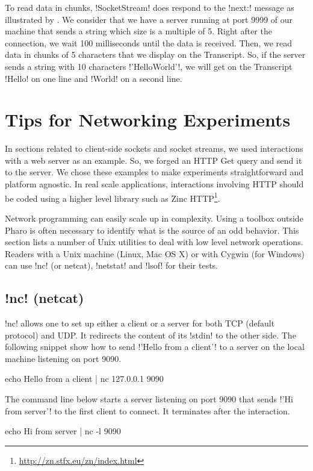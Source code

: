 \documentclass[a4paper,10pt,twoside]{book}
\begin{document}
To read data in chunks, \ct!SocketStream! does respond to the \ct!next:! message as illustrated by .
We consider that we have a server running at port 9999 of our machine that sends a string which size is a multiple of 5.
Right after the connection, we wait 100 milliseconds until the data is received.
Then, we read data in chunks of 5 characters that we display on the Transcript.
So, if the server sends a string with 10 characters \ct!'HelloWorld'!, we will get on the Transcript \ct!Hello! on one line and \ct!World! on a second line.

\section{Tips for Networking Experiments}
In sections related to client-side sockets and socket streams, we used interactions with a web server as an example. So, we forged an HTTP Get query and send it to the server.
We chose these examples to make experiments straightforward and platform agnostic.
In real scale applications, interactions involving HTTP should be coded using a higher level library such as Zinc HTTP\footnote{\url{http://zn.stfx.eu/zn/index.html}}.

Network programming can easily scale up in complexity. Using a toolbox outside Pharo is often necessary to identify what is the source of an odd behavior. This section lists a number of Unix utilities to deal with low level network operations.
Readers with a Unix machine (Linux, Mac OS X) or with Cygwin (for Windows) can use \ct!nc! (or netcat), \ct!netstat! and \ct!lsof! for their tests.

\subsection{\ct!nc! (netcat)}
\ct!nc! allows one to set up either a client or a server for both TCP (default protocol) and UDP.
It redirects the content of its \ct!stdin! to the other side.
The following snippet show how to send \ct!'Hello from a client'! to a server on the local machine listening on port 9090.
\begin{code}{}
echo Hello from a client | nc 127.0.0.1 9090 
\end{code}

The command line below starts a server listening on port 9090 that sends \ct!'Hi from server'! to the first client to connect.
It terminates after the interaction.
\begin{code}{}
echo Hi from server | nc -l 9090 
\end{code}
\end{document}
